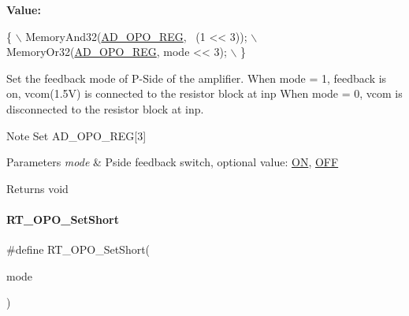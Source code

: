 {\bfseries Value\+:}
\begin{DoxyCode}
\{                                       \(\backslash\)
        MemoryAnd32(\mbox{\hyperlink{a00020_adadaa0ab1ebbd7ba9b70dfd24c3ed44da6dc7e2b1252e5ac208ae78d9c46e8e7e}{AD\_OPO\_REG}}, ~(1 << 3)); \(\backslash\)
        MemoryOr32(\mbox{\hyperlink{a00020_adadaa0ab1ebbd7ba9b70dfd24c3ed44da6dc7e2b1252e5ac208ae78d9c46e8e7e}{AD\_OPO\_REG}}, mode << 3);  \(\backslash\)
    \}
\end{DoxyCode}


Set the feedback mode of P-\/\+Side of the amplifier. When mode = 1, feedback is on, vcom(1.\+5V) is connected to the resistor block at inp When mode = 0, vcom is disconnected to the resistor block at inp. 

\begin{DoxyNote}{Note}
Set A\+D\+\_\+\+O\+P\+O\+\_\+\+R\+EG\mbox{[}3\mbox{]} 
\end{DoxyNote}

\begin{DoxyParams}{Parameters}
{\em mode} & Pside feedback switch, optional value\+: \mbox{\hyperlink{a00020_ad76d1750a6cdeebd506bfcd6752554d2}{ON}}, \mbox{\hyperlink{a00020_a29e413f6725b2ba32d165ffaa35b01e5}{O\+FF}} \\
\hline
\end{DoxyParams}
\begin{DoxyReturn}{Returns}
void 
\end{DoxyReturn}
\mbox{\label{a00002_aef61e41bd9fb19c3690ff5a25fb9893d}} 
\paragraph{\texorpdfstring{R\+T\+\_\+\+O\+P\+O\+\_\+\+Set\+Short}{RT\_OPO\_SetShort}}
{\footnotesize\ttfamily \#define R\+T\+\_\+\+O\+P\+O\+\_\+\+Set\+Short(\begin{DoxyParamCaption}\item[{}]{mode }\end{DoxyParamCaption})}


